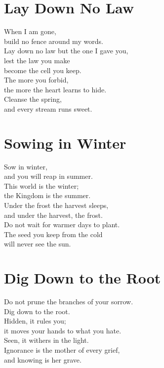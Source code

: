 \documentclass[10pt, openright]{book}
\newcommand{\sectionbreak}{\filbreak}
\newcommand{\sayingsource}[1]{\par\nopagebreak\vspace{0.3\baselineskip}{\raggedleft\footnotesize\itshape #1\par}}
\begin{document}
\sayingsource{Tao Te Ching 55 · Thomas 4 · Luke 10:19}

\sectionbreak

\section{Lay Down No Law}\label{lay-down-no-law}

When I am gone,\\
build no fence around my words.\\
Lay down no law but the one I gave you,\\
lest the law you make\\
become the cell you keep.\\
The more you forbid,\\
the more the heart learns to hide.\\
Cleanse the spring,\\
and every stream runs sweet.

\sayingsource{Tao Te Ching 57 · Mary 9}

\sectionbreak

\section{Sowing in Winter}\label{sowing-in-winter}

Sow in winter,\\
and you will reap in summer.\\
This world is the winter;\\
the Kingdom is the summer.\\
Under the frost the harvest sleeps,\\
and under the harvest, the frost.\\
Do not wait for warmer days to plant.\\
The seed you keep from the cold\\
will never see the sun.

\sayingsource{Tao Te Ching 58 · Philip}

\sectionbreak

\section{Dig Down to the Root}\label{dig-down-to-the-root}

Do not prune the branches of your sorrow.\\
Dig down to the root.\\
Hidden, it rules you;\\
it moves your hands to what you hate.\\
Seen, it withers in the light.\\
Ignorance is the mother of every grief,\\
and knowing is her grave.
\end{document}
